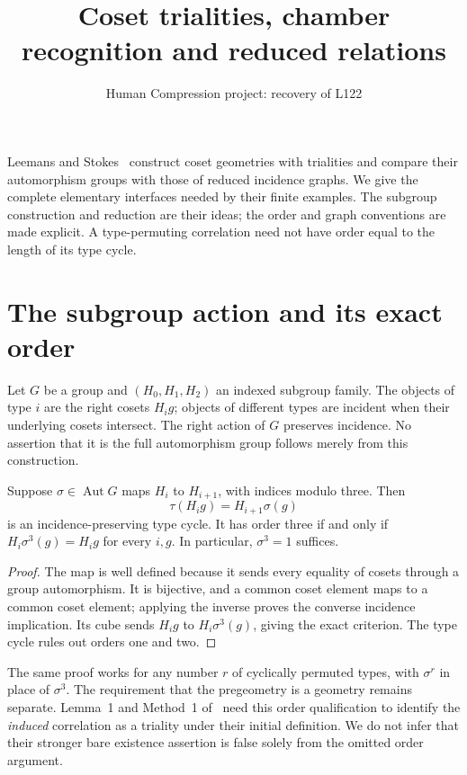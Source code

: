 \documentclass[11pt,a4paper]{article}
\title{Coset trialities, chamber recognition and reduced relations}
\author{Human Compression project: recovery of L122}\date{}
\begin{document}
\maketitle
Leemans and Stokes~\cite{LS} construct coset geometries with trialities and
compare their automorphism groups with those of reduced incidence graphs.
We give the complete elementary interfaces needed by their finite examples.
The subgroup construction and reduction are their ideas; the order and graph
conventions are made explicit. A type-permuting correlation need not have
order equal to the length of its type cycle.

\section{The subgroup action and its exact order}
Let $G$ be a group and $(H_0,H_1,H_2)$ an indexed subgroup family.
The objects of type $i$ are the right cosets $H_i g$; objects of different
types are incident when their underlying cosets intersect. The right action
of $G$ preserves incidence. No assertion that it is the full automorphism
group follows merely from this construction.

\begin{proposition}\label{cycle}
Suppose $\sigma\in\operatorname{Aut}G$ maps $H_i$ to $H_{i+1}$, with indices
modulo three. Then
\[
 \tau(H_i g)=H_{i+1}\sigma(g)
\]
is an incidence-preserving type cycle. It has order three if and only if
$H_i\sigma^3(g)=H_i g$ for every $i,g$. In particular, $\sigma^3=1$ suffices.
\end{proposition}
\begin{proof}
The map is well defined because it sends every equality of cosets through a
group automorphism. It is bijective, and a common coset element maps to a
common coset element; applying the inverse proves the converse incidence
implication. Its cube sends $H_i g$ to $H_i\sigma^3(g)$, giving the exact
criterion. The type cycle rules out orders one and two.
\end{proof}
The same proof works for any number $r$ of cyclically permuted types, with
$\sigma^r$ in place of $\sigma^3$. The requirement that the pregeometry is
a geometry remains separate. Lemma~1 and Method~1 of~\cite{LS} need this
order qualification to identify the \emph{induced} correlation as a triality
under their initial definition. We do not infer that their stronger bare
existence assertion is false solely from the omitted order argument.
\end{document}
